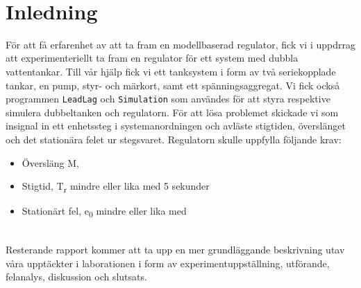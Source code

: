%
%




\newpage
\thispagestyle{empty}
\tableofcontents
\newpage



\listoffigures
~\\

\listoftables
\newpage


\pagestyle{fancy}

\fancyhead{} %
\fancyhead[R]{\today \slshape}

\fancyfoot{} %
\fancyfoot[L,R]{\thepage}



\section{Inledning}

För att få erfarenhet av att ta fram en modellbaserad regulator, fick vi i uppdrrag att experimenteriellt ta fram en regulator för ett system med dubbla vattentankar. Till vår hjälp fick vi ett tanksystem i form av två seriekopplade tankar, en pump, styr- och märkort, samt ett spänningsaggregat. Vi fick också programmen \texttt{LeadLag} och \texttt{Simulation} som användes för att styra respektive simulera dubbeltanken och regulatorn. För att lösa problemet skickade vi som insignal in ett enhetssteg i systemanordningen och avläste stigtiden, överslänget och det stationära felet ur stegsvaret. Regulatorn skulle uppfylla följande krav:	
~\\
	\begin{itemize}
		\item Översläng M,
		\item Stigtid, T\textsubscript{r} mindre eller lika med 5 sekunder 
		\item Stationärt fel, e\textsubscript{0} mindre eller lika med 
	\end{itemize}

~\\
Resterande rapport kommer att ta upp en mer grundläggande beskrivning utav våra upptäckter i laborationen i form av experimentuppställning, utförande, felanalys, diskussion och slutsats.


